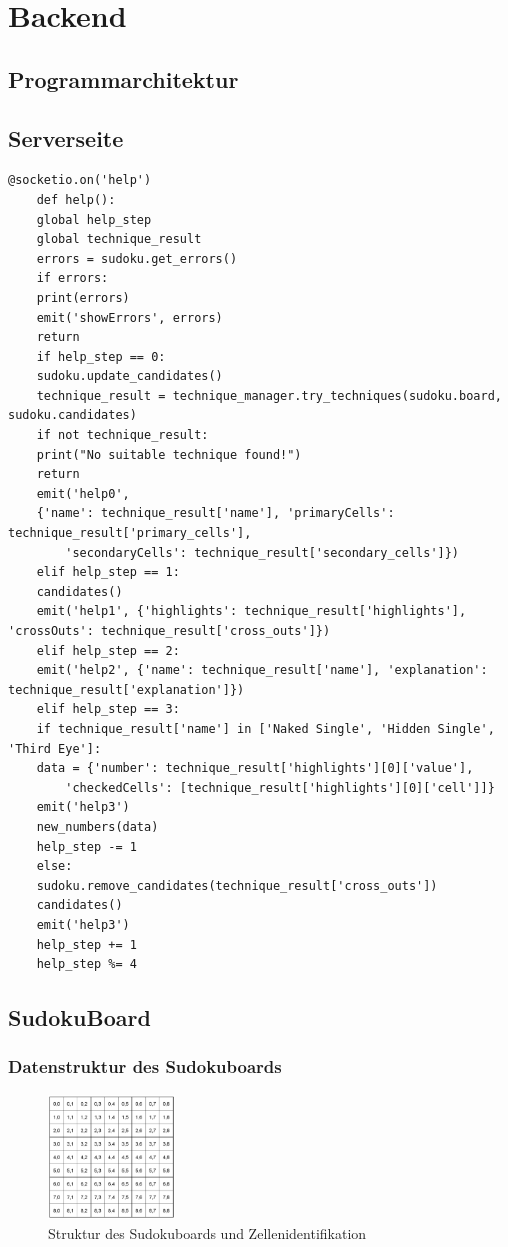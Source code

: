 
\chapter{Backend}

\section{Programmarchitektur}


\section{Serverseite}
\begin{lstlisting}[caption={Serverseitige Implementierung für das Anwenden der Hilfestellungen}, label={lst:Serverseitig}]
	@socketio.on('help')
	def help():
	global help_step
	global technique_result
	errors = sudoku.get_errors()
	if errors:
	print(errors)
	emit('showErrors', errors)
	return
	if help_step == 0:
	sudoku.update_candidates()
	technique_result = technique_manager.try_techniques(sudoku.board, sudoku.candidates)
	if not technique_result:
	print("No suitable technique found!")
	return
	emit('help0',
	{'name': technique_result['name'], 'primaryCells': technique_result['primary_cells'],
		'secondaryCells': technique_result['secondary_cells']})
	elif help_step == 1:
	candidates()
	emit('help1', {'highlights': technique_result['highlights'], 'crossOuts': technique_result['cross_outs']})
	elif help_step == 2:
	emit('help2', {'name': technique_result['name'], 'explanation': technique_result['explanation']})
	elif help_step == 3:
	if technique_result['name'] in ['Naked Single', 'Hidden Single', 'Third Eye']:
	data = {'number': technique_result['highlights'][0]['value'],
		'checkedCells': [technique_result['highlights'][0]['cell']]}
	emit('help3')
	new_numbers(data)
	help_step -= 1
	else:
	sudoku.remove_candidates(technique_result['cross_outs'])
	candidates()
	emit('help3')
	help_step += 1
	help_step %= 4
\end{lstlisting}

\section{SudokuBoard}
\subsection{Datenstruktur des Sudokuboards}
\begin{figure}[htbp]
	\centering
	\includegraphics[width=0.3\textwidth]{images/board.png}
	\caption{Struktur des Sudokuboards und Zellenidentifikation}
	\label{fig:Sudokugitter}
\end{figure}

